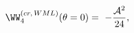 \begin{equation}
\label{tetazero}
\WW_{4}^{(cr, \, WML)}(\theta = 0) =\ - {{{\cal A}^2 }\over {24}},
\end{equation}


